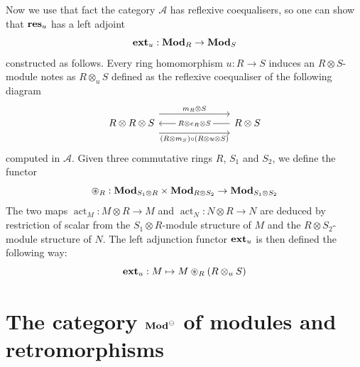 \documentclass[8pt]{article}
\theoremstyle{definition}
\theoremstyle{definition}
\theoremstyle{definition}
\theoremstyle{definition}
\theoremstyle{definition}
\theoremstyle{definition}
\theoremstyle{definition}
\theoremstyle{definition}
\theoremstyle{definition}
\theoremstyle{definition}
\theoremstyle{definition}
\theoremstyle{definition}
\theoremstyle{definition}
\theoremstyle{definition}
\theoremstyle{question}
\begin{document}
Now we use that fact the category $\mathcal{A}$ has reflexive coequalisers, so one can show that ${\bf res}_u$ has a left adjoint
\[
{\bf ext}_u : {\bf Mod}_R \to {\bf Mod}_S
\]
constructed as follows. Every ring homomorphism $u : R \to S$ induces an $R \otimes S$-module notes as $R \otimes_u S$ defined as the reflexive 
coequaliser of the following diagram
\[
\begin{tikzcd}
  R \otimes R \otimes S \arrow[rrr, shift left=4, "m_R \otimes S"] \arrow[rrr, shift right=4, "(R \otimes m_S) \circ (R \otimes u \otimes S)"'] &&& R \otimes S \ar[lll, "R \otimes e_R \otimes S" description]
\end{tikzcd}
\]
computed in $\mathcal{A}$. Given three commutative rings $R$, $S_1$ and $S_2$, we define the functor 
\[
\circledast_R : {\bf Mod}_{S_1 \otimes R} \times {\bf Mod}_{R \otimes S_2} \to {\bf Mod}_{S_1 \otimes S_2}
\]
The two maps $\operatorname{act}_M : M \otimes R \to M$ and $\operatorname{act}_N : N \otimes R \to N$ are deduced by restriction of scalar
from the $S_1 \otimes R$-module structure of $M$ and the $R \otimes S_2$-module structure of $N$. The left adjunction functor ${\bf ext}_u$
is then defined the following way:
\[
{\bf ext}_u : M \mapsto M \circledast_R (R \otimes_u S)
\]

\section{The category ${\bf Mod}^{\ominus}$ of modules and retromorphisms}
\end{document}
